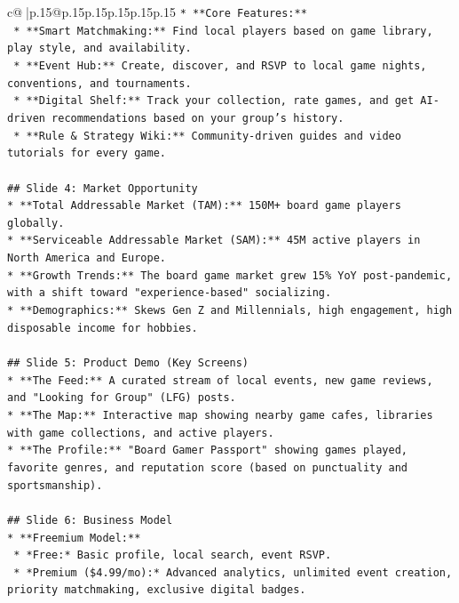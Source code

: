 \documentclass{article}
\begin{document}
{\begin{supertabular}{c@{$\;$}|p{.15\linewidth}@{}p{.15\linewidth}p{.15\linewidth}p{.15\linewidth}p{.15\linewidth}p{.15\linewidth}}
{{{\texttt{*   **Core Features:**} \\
\texttt{    *   **Smart Matchmaking:** Find local players based on game library, play style, and availability.} \\
\texttt{    *   **Event Hub:** Create, discover, and RSVP to local game nights, conventions, and tournaments.} \\
\texttt{    *   **Digital Shelf:** Track your collection, rate games, and get AI{-}driven recommendations based on your group's history.} \\
\texttt{    *   **Rule \& Strategy Wiki:** Community{-}driven guides and video tutorials for every game.} \\
\\ 
\texttt{\#\# Slide 4: Market Opportunity} \\
\texttt{*   **Total Addressable Market (TAM):** 150M+ board game players globally.} \\
\texttt{*   **Serviceable Addressable Market (SAM):** 45M active players in North America and Europe.} \\
\texttt{*   **Growth Trends:** The board game market grew 15\% YoY post{-}pandemic, with a shift toward "experience{-}based" socializing.} \\
\texttt{*   **Demographics:** Skews Gen Z and Millennials, high engagement, high disposable income for hobbies.} \\
\\ 
\texttt{\#\# Slide 5: Product Demo (Key Screens)} \\
\texttt{*   **The Feed:** A curated stream of local events, new game reviews, and "Looking for Group" (LFG) posts.} \\
\texttt{*   **The Map:** Interactive map showing nearby game cafes, libraries with game collections, and active players.} \\
\texttt{*   **The Profile:** "Board Gamer Passport" showing games played, favorite genres, and reputation score (based on punctuality and sportsmanship).} \\
\\ 
\texttt{\#\# Slide 6: Business Model} \\
\texttt{*   **Freemium Model:**} \\
\texttt{    *   *Free:* Basic profile, local search, event RSVP.} \\
\texttt{    *   *Premium (\$4.99/mo):* Advanced analytics, unlimited event creation, priority matchmaking, exclusive digital badges.} \\
}}}
\end{supertabular}}
\end{document}
